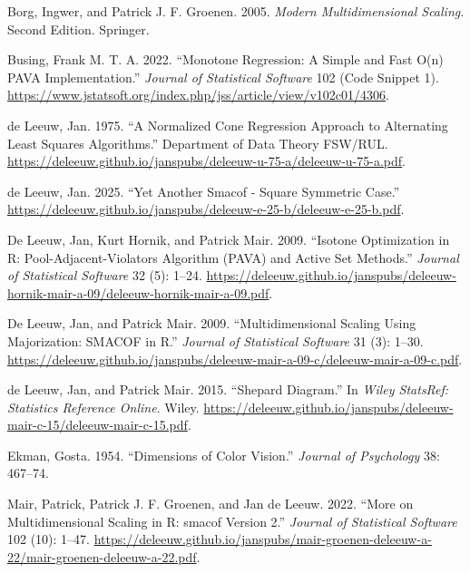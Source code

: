 \documentclass[
  12pt,
  letterpaper,
  DIV=11,
  numbers=noendperiod]{scrartcl}
\newlength{\cslhangindent}
\newenvironment{CSLReferences}[2] %
 {\begin{list}{}{%
  \setlength{\itemindent}{0pt}
  \setlength{\leftmargin}{0pt}
  \setlength{\parsep}{0pt}
  \ifodd #1
   \setlength{\leftmargin}{\cslhangindent}
   \setlength{\itemindent}{-1\cslhangindent}
  \fi
  \setlength{\itemsep}{#2\baselineskip}}}
 {\end{list}}
\begin{document}
\protect{}\label{refs}
\begin{CSLReferences}{1}{1}
Borg, Ingwer, and Patrick J. F. Groenen. 2005. \emph{Modern
Multidimensional Scaling}. Second Edition. Springer.

Busing, Frank M. T. A. 2022. {``{Monotone Regression: A Simple and Fast
O(n) PAVA Implementation.}''} \emph{Journal of Statistical Software} 102
(Code Snippet 1).
\url{https://www.jstatsoft.org/index.php/jss/article/view/v102c01/4306}.

{de Leeuw, Jan}. 1975. {``{A Normalized Cone Regression Approach to
Alternating Least Squares Algorithms}.''} Department of Data Theory
FSW/RUL.
\url{https://deleeuw.github.io/janspubs/deleeuw-u-75-a/deleeuw-u-75-a.pdf}.

{de Leeuw, Jan}. 2025. {``{Yet Another Smacof - Square Symmetric
Case}.''}
\url{https://deleeuw.github.io/janspubs/deleeuw-e-25-b/deleeuw-e-25-b.pdf}.

De Leeuw, Jan, Kurt Hornik, and Patrick Mair. 2009. {``{Isotone
Optimization in R: Pool-Adjacent-Violators Algorithm (PAVA) and Active
Set Methods}.''} \emph{Journal of Statistical Software} 32 (5): 1--24.
\url{https://deleeuw.github.io/janspubs/deleeuw-hornik-mair-a-09/deleeuw-hornik-mair-a-09.pdf}.

De Leeuw, Jan, and Patrick Mair. 2009. {``{Multidimensional Scaling
Using Majorization: SMACOF in R}.''} \emph{Journal of Statistical
Software} 31 (3): 1--30.
\url{https://deleeuw.github.io/janspubs/deleeuw-mair-a-09-c/deleeuw-mair-a-09-c.pdf}.

{de Leeuw, Jan, and Patrick Mair}. 2015. {``{Shepard Diagram}.''} In
\emph{Wiley {StatsRef}: Statistics Reference Online}. Wiley.
\url{https://deleeuw.github.io/janspubs/deleeuw-mair-c-15/deleeuw-mair-c-15.pdf}.

Ekman, Gosta. 1954. {``{Dimensions of Color Vision}.''} \emph{Journal of
Psychology} 38: 467--74.

{Mair, Patrick, Patrick J. F. Groenen, and Jan de Leeuw}. 2022. {``{More
on Multidimensional Scaling in R: smacof Version 2}.''} \emph{Journal of
Statistical Software} 102 (10): 1--47.
\url{https://deleeuw.github.io/janspubs/mair-groenen-deleeuw-a-22/mair-groenen-deleeuw-a-22.pdf}.


\end{CSLReferences}
\end{document}
